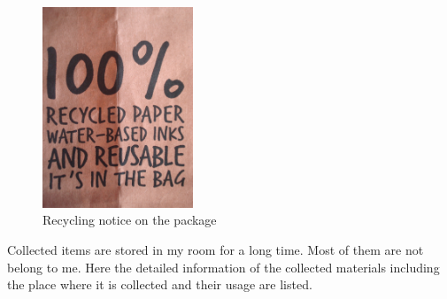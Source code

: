 \begin{figure}[h!]
  \centering
  \includegraphics[height=6cm]{project_graphics/recycled_note.jpg}
  \caption{Recycling notice on the package}
  \label{fig:NoteOnPackage}
\end{figure}







Collected items are stored in my room for a long time. Most of them are not belong to me. Here the detailed information of the collected materials including the place where it is collected and their usage are listed.

